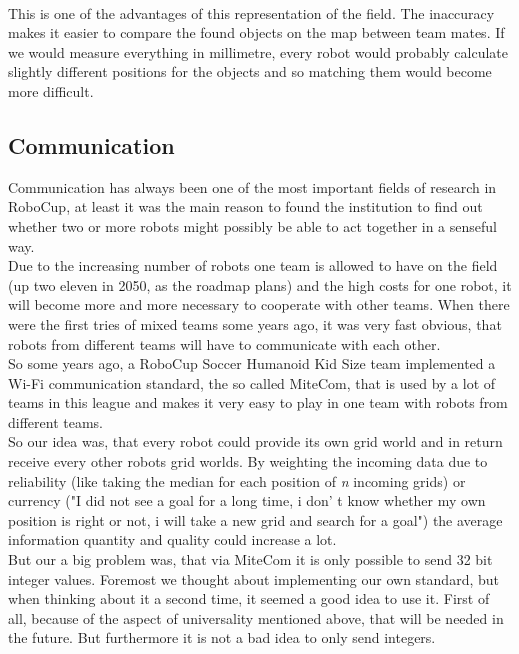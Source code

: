 \documentclass[lnicst,a4paper]{svmultln}
\begin{document}
\\
This is one of the advantages of this representation of the field. The inaccuracy makes it easier to compare the found objects on the map between team mates. If we would measure everything in millimetre, every robot would probably calculate slightly different positions for the objects and so matching them would become more difficult.





\subsection{Communication}
\label{sec:solutions_communication}
Communication has always been one of the most important fields of research in RoboCup, at least it was the main reason to found the institution to find out whether two or more robots might possibly be able to act together in a senseful way. 
\\
Due to the increasing number of robots one team is allowed to have on the field (up two eleven in 2050, as the roadmap plans) and the high costs for one robot, it will become more and more necessary to cooperate with other teams. When there were the first tries of mixed teams some years ago, it was very fast obvious, that robots from different teams will have to communicate with each other.
\\
So some years ago, a RoboCup Soccer Humanoid Kid Size team implemented a Wi-Fi communication standard, the so called MiteCom,  that is used by a lot of teams in this league and makes it very easy to play in one team with robots from different teams. 
\\
So our idea was, that every robot could provide its own grid world and in return receive every other robots grid worlds. By weighting the incoming data due to reliability (like taking the median for each position of \textit{n} incoming grids) or currency ("I did not see a goal for a long time, i don' t know whether my own position is right or not, i will take a new grid and search for a goal") the average information quantity and quality could increase a lot.
\\
But our a big problem was, that via MiteCom it is only possible to send 32 bit integer values. Foremost we thought about implementing our own standard, but when thinking about it a second time, it seemed a good idea to use it. First of all, because of the aspect of universality mentioned above, that will be needed in the future. But furthermore it is not a bad idea to only send integers. 
\end{document}
